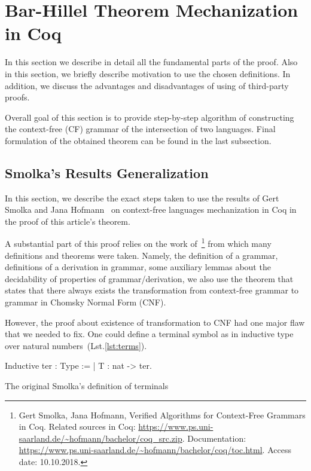 \section{Bar-Hillel Theorem Mechanization in Coq}
\label{sec:main}

In this section we describe in detail all the fundamental parts of the proof. 
Also in this section, we briefly describe motivation to use the chosen definitions. 
In addition, we discuss the advantages and disadvantages of using of third-party proofs. 

Overall goal of this section is to provide step-by-step algorithm of constructing the context-free (CF) grammar of the intersection of two languages.
Final formulation of the obtained theorem can be found in the last subsection. 
   
\subsection{ Smolka's Results Generalization}
\label{sec:solka-generalized}

In this section, we describe the exact steps taken to use the results of Gert Smolka and Jana Hofmann~\cite{smolkaHofmann2016} on context-free languages mechanization in Coq in the proof of this article's theorem.

A substantial part of this proof relies on the work of~\cite{smolkaHofmann2016}\footnote{Gert Smolka, Jana Hofmann, Verified Algorithms for Context-Free Grammars in Coq. Related sources in Coq: \url{https://www.ps.uni-saarland.de/~hofmann/bachelor/coq_src.zip}. Documentation: \url{https://www.ps.uni-saarland.de/~hofmann/bachelor/coq/toc.html}. Access date: 10.10.2018.} from which many definitions and theorems were taken. Namely, the definition of a grammar, definitions of a derivation in grammar, some auxiliary lemmas about the decidability of properties of grammar/derivation, we also use the theorem that states that there always exists the transformation from context-free grammar to grammar in Chomsky Normal Form (CNF).

However, the proof about existence of transformation to CNF had one major flaw that we needed to fix. One could define a terminal symbol as in inductive type over natural numbers~(Lst.\ref{lst:terms}).

\begin{listing}[h]
	\begin{pyglist}[language=coq, numbers=none, numbersep=5pt]
  Inductive ter : Type := | T : nat -> ter.
	\end{pyglist}
	\caption{The original Smolka's definition of terminals}
	\label{lst:terms}
\end{listing}


